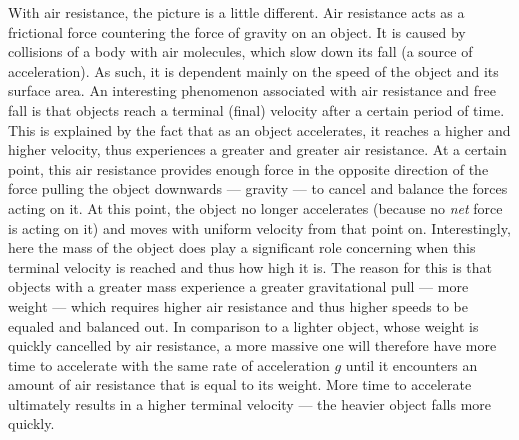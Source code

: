 \begin{figure}[h!]
	\centering
\end{figure}

With air resistance, the picture is a little different. Air resistance acts as a frictional force countering the force of gravity on an object. It is caused by collisions of a body with air molecules, which slow down its fall (a source of acceleration). As such, it is dependent mainly on the speed of the object and its surface area. An interesting phenomenon associated with air resistance and free fall is that objects reach a terminal (final) velocity after a certain period of time. This is explained by the fact that as an object accelerates, it reaches a higher and higher velocity, thus experiences a greater and greater air resistance. At a certain point, this air resistance provides enough force in the opposite direction of the force pulling the object downwards --- gravity --- to cancel and balance the forces acting on it. At this point, the object no longer accelerates (because no \emph{net} force is acting on it) and moves with uniform velocity from that point on. Interestingly, here the mass of the object does play a significant role concerning when this terminal velocity is reached and thus how high it is. The reason for this is that objects with a greater mass experience a greater gravitational pull --- more weight --- which requires higher air resistance and thus higher speeds to be equaled and balanced out. In comparison to a lighter object, whose weight is quickly cancelled by air resistance, a more massive one will therefore have more time to accelerate with the same rate of acceleration $g$ until it encounters an amount of air resistance that is equal to its weight. More time to accelerate ultimately results in a higher terminal velocity --- the heavier object falls more quickly.

